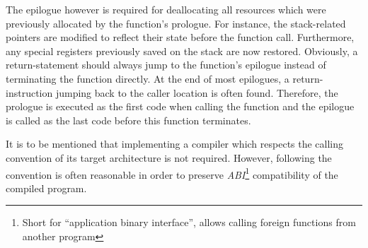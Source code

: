 The epilogue however is required for deallocating all resources which were previously allocated by the function's prologue.
For instance, the stack-related pointers are modified to reflect their state before the function call.
Furthermore, any special registers previously saved on the stack are now restored.
Obviously, a return-statement should always jump to the function's epilogue instead of terminating the function directly.
At the end of most epilogues, a return-instruction jumping back to the caller location is often found.
Therefore, the prologue is executed as the first code when calling the function and the epilogue is called as the last code before this function terminates.

It is to be mentioned that implementing a compiler which respects the calling convention of its target architecture is not required.
However, following the convention is often reasonable in order to preserve \emph{ABI}\footnote{Short for \enquote{application binary interface}, allows calling foreign functions from another program} compatibility of the compiled program.
